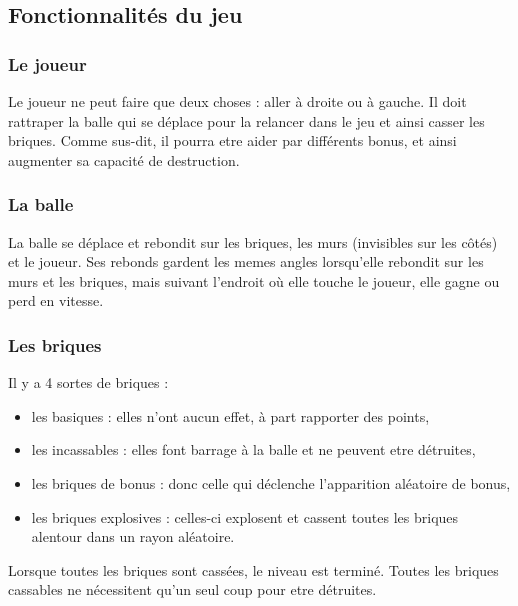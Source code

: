 \documentclass[a4paper,10pt]{article}
\begin{document}
\subsection{Fonctionnalités du jeu}
    \subsubsection{Le joueur}
        Le joueur ne peut faire que deux choses : aller à droite ou à gauche. Il doit rattraper la balle
        qui se déplace pour la relancer dans le jeu et ainsi casser les briques. Comme sus-dit, il pourra
        etre aider par différents bonus, et ainsi augmenter sa capacité de destruction.

    \subsubsection{La balle}
        La balle se déplace et rebondit sur les briques, les murs (invisibles sur les côtés) et le joueur.
        Ses rebonds gardent les memes angles lorsqu'elle rebondit sur les murs et les briques, mais suivant
        l'endroit où elle touche le joueur, elle gagne ou perd en vitesse.

    \subsubsection{Les briques}
        Il y a 4 sortes de briques :
        \begin{itemize}
            \item les basiques : elles n'ont aucun effet, à part rapporter des points,
            \item les incassables : elles font barrage à la balle et ne peuvent etre détruites,
            \item les briques de bonus : donc celle qui déclenche l'apparition aléatoire de bonus,
            \item les briques explosives : celles-ci explosent et cassent toutes les briques alentour
                    dans un rayon aléatoire.
        \end{itemize}

        Lorsque toutes les briques sont cassées, le niveau est terminé. Toutes les briques cassables
        ne nécessitent qu'un seul coup pour etre détruites.
\end{document}
